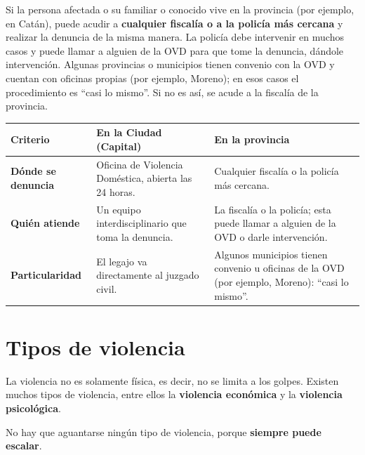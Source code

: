 \documentclass[12pt,oneside]{book}
\begin{document}
Si la persona afectada o su familiar o conocido vive en la provincia (por ejemplo, en Catán), puede acudir a \textbf{cualquier fiscalía o a la policía más cercana} y realizar la denuncia de la misma manera. La policía debe intervenir en muchos casos y puede llamar a alguien de la OVD para que tome la denuncia, dándole intervención. %
Algunas provincias o municipios tienen convenio con la OVD y cuentan con oficinas propias (por ejemplo, Moreno); en esos casos el procedimiento es ``casi lo mismo''. Si no es así, se acude a la fiscalía de la provincia.

\begin{table}[H]
\centering
\small
\begin{tabularx}{\textwidth}{
    >{\raggedright\arraybackslash}p{3cm}
    >{\raggedright\arraybackslash}X
    >{\raggedright\arraybackslash}X
}
\toprule
\textbf{Criterio} & \textbf{En la Ciudad (Capital)} & \textbf{En la provincia} \\
\midrule
\textbf{Dónde se denuncia} & Oficina de Violencia Doméstica, abierta las 24 horas. & Cualquier fiscalía o la policía más cercana. \\
\textbf{Quién atiende} & Un equipo interdisciplinario que toma la denuncia. & La fiscalía o la policía; esta puede llamar a alguien de la OVD o darle intervención. \\
\textbf{Particularidad} & El legajo va directamente al juzgado civil. & Algunos municipios tienen convenio u oficinas de la OVD (por ejemplo, Moreno): ``casi lo mismo''. \\
\bottomrule
\end{tabularx}
\end{table}

\section{Tipos de violencia}

La violencia no es solamente física, es decir, no se limita a los golpes. Existen muchos tipos de violencia, entre ellos la \textbf{violencia económica} y la \textbf{violencia psicológica}.

\begin{important}
No hay que aguantarse ningún tipo de violencia, porque \textbf{siempre puede escalar}.
\end{important}
\end{document}
